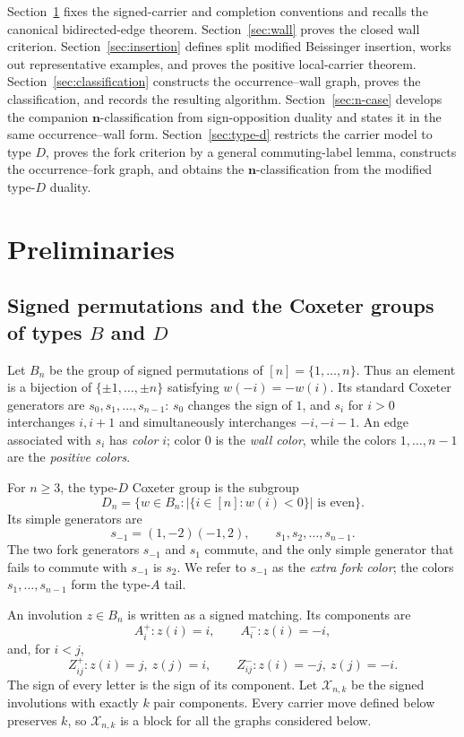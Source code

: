 \documentclass[11pt]{article}
\theoremstyle{definition}
\theoremstyle{remark}
\newcommand{\cX}{\mathcal X}
\newcommand{\ngraph}{\mathbf n}
\begin{document}
Section~\ref{sec:carriers} fixes the signed-carrier and completion
conventions and recalls the canonical bidirected-edge theorem.
Section~\ref{sec:wall} proves the closed wall criterion.
Section~\ref{sec:insertion} defines split modified Beissinger insertion,
works out representative examples, and proves the positive local-carrier
theorem.  Section~\ref{sec:classification} constructs the
occurrence--wall graph, proves the classification, and records the
resulting algorithm.  Section~\ref{sec:n-case} develops the companion
$\ngraph$-classification from sign-opposition duality and states it in
the same occurrence--wall form.  Section~\ref{sec:type-d} restricts the
carrier model to type $D$, proves the fork criterion by a general
commuting-label lemma, constructs the occurrence--fork graph, and obtains
the $\ngraph$-classification from the modified type-$D$ duality.

\section{Preliminaries}
\label{sec:carriers}

\subsection{Signed permutations and the Coxeter groups of types
\texorpdfstring{$B$ and $D$}{B and D}}

Let $B_n$ be the group of signed permutations of $[n]=\{1,\ldots,n\}$.
Thus an element is a bijection of $\{\pm1,\ldots,\pm n\}$ satisfying
$w(-i)=-w(i)$.  Its standard Coxeter generators are $s_0,s_1,\ldots,s_{n-1}$:
$s_0$ changes the sign of $1$, and $s_i$ for $i>0$ interchanges $i,i+1$
and simultaneously interchanges $-i,-i-1$.  An edge associated with
$s_i$ has \emph{color} $i$; color $0$ is the \emph{wall color}, while
the colors $1,\ldots,n-1$ are the \emph{positive colors}.

For $n\geq3$, the type-$D$ Coxeter group is the subgroup
\[
 D_n=\{w\in B_n:|\{i\in[n]:w(i)<0\}|\text{ is even}\}.
\]
Its simple generators are
\[
 s_{-1}=(1,-2)(-1,2),\qquad s_1,s_2,\ldots,s_{n-1}.
\]
The two fork generators $s_{-1}$ and $s_1$ commute, and the only simple
generator that fails to commute with $s_{-1}$ is $s_2$.  We refer to
$s_{-1}$ as the \emph{extra fork color}; the colors
$s_1,\ldots,s_{n-1}$ form the type-$A$ tail.

An involution $z\in B_n$ is written as a signed matching.  Its components
are
\[
 A_i^+ : z(i)=i,\qquad A_i^- : z(i)=-i,
\]
and, for $i<j$,
\[
 Z_{ij}^+ : z(i)=j,\ z(j)=i,
 \qquad
 Z_{ij}^- : z(i)=-j,\ z(j)=-i.
\]
The sign of every letter is the sign of its component.  Let
$\cX_{n,k}$ be the signed involutions with exactly $k$ pair components.
Every carrier move defined below preserves $k$, so $\cX_{n,k}$ is a block
for all the graphs considered below.
\end{document}
